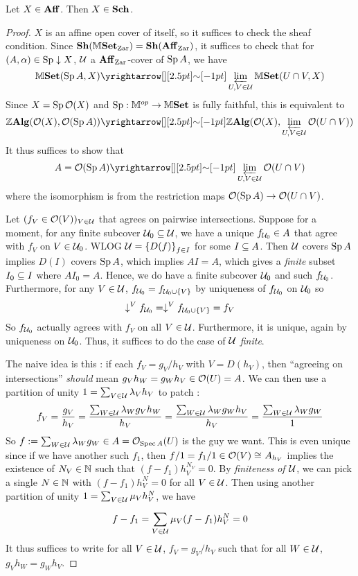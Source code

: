 \documentclass[../main.tex]{subfiles}
\begin{document}
\begin{prop}
  
  Let $X \in \mathbf{Aff}$.
  Then $X \in \mathbf{Sch}$.
\end{prop}
\begin{proof}
  $X$ is an affine open cover of itself, so it suffices to check 
  the sheaf condition. 
  Since $\mathbf{Sh}(\mathbb{M}\mathbf{Set}_{\mathrm{Zar}}) = \mathbf{Sh}(\mathbf{Aff}_{\mathrm{Zar}})$,
  it suffices to check that for 
  $(A,\alpha) \in \operatorname{Sp}\downarrow X$, $\mathcal{U}$ a $\mathbf{Aff}_{\mathrm{Zar}}$-cover of $\operatorname{Sp} A$, 
  we have \[
    \M\SET(\SP A,X) \map{\sim}{} \LIM_{U,V \in \UU} \M\SET(U\cap V,X)
  \]
  Since $X = \operatorname{Sp} \mathcal{O}(X)$ and $\operatorname{Sp} : \mathbb{M}^{op} \to \mathbb{M}\mathbf{Set}$ is fully faithful,
  this is equivalent to \[
    \Z\ALG(\OO(X),\OO(\SP A)) \map{\sim}{}
    \Z\ALG(\OO(X),\LIM_{U,V\in \UU} \OO(U\cap V))
  \]
  It thus suffices to show that \[
    A = \OO(\SP A) \map{\sim}{} \LIM_{U,V \in \UU} \OO(U \cap V)
  \]
  where the isomorphism is from the restriction maps 
  $\mathcal{O}(\operatorname{Sp} A) \to \mathcal{O}(U \cap V)$.

  Let $(f_V \in \mathcal{O}(V))_{V \in \mathcal{U}}$ that agrees on pairwise intersections.
  Suppose for a moment, 
  for any finite subcover $\mathcal{U}_0 \subseteq \mathcal{U}$,
  we have a unique $f_{\mathcal{U}_0} \in A$ that 
  agree with $f_V$ on $V \in \mathcal{U}_0$.
  WLOG $\mathcal{U} = \left\{D(f)\right\}_{f \in I}$ for some $I \subseteq A$.
  Then $\mathcal{U}$ covers $\operatorname{Sp} A$ implies 
  $D(I)$ covers $\operatorname{Sp} A$, which implies $AI = A$,
  which gives a \emph{finite} subset $I_0 \subseteq I$ where $AI_0 = A$.
  Hence, we do have a finite subcover $\mathcal{U}_0$ and such $f_{\mathcal{U}_0}$.
  Furthermore, 
  for any $V \in \mathcal{U}$, $f_{\mathcal{U}_0} = f_{\mathcal{U}_0 \cup \left\{V\right\}}$ by 
  uniqueness of $f_{\mathcal{U}_0}$ on $\mathcal{U}_0$ so
  \[
    \downarrow_{}^{V} f_{\mathcal{U}_0} = \downarrow_{}^{V} f_{\mathcal{U}_0 \cup \left\{V\right\}} = f_V
  \]
  So $f_{\mathcal{U}_0}$ actually agrees with $f_V$ on all $V \in \mathcal{U}$.
  Furthermore, it is unique, again by uniqueness on $\mathcal{U}_0$.
  Thus, it suffices to do the case of \emph{$\mathcal{U}$ finite}.

  The naive idea is this : 
  if each $f_V = g_V / h_V$ with $V = D(h_V)$,
  then ``agreeing on intersections'' \emph{should} mean 
  $g_V h_W = g_W h_V \in \mathcal{O}(U) = A$.
  We can then use a partition of unity $1 = \sum_{V \in \mathcal{U}}^{} \lambda_V h_V$
  to patch : \[
    f_V = \frac{g_V}{h_V}
    = \frac{\sum_{W \in \mathcal{U}}^{} \lambda_W g_V h_W}{h_V}
    = \frac{\sum_{W \in \mathcal{U} }^{} \lambda_W g_W h_V}{h_V}
    = \frac{\sum_{W \in \mathcal{U}}^{} \lambda_W g_W}{1}
  \]
  So $f := \sum_{W \in \mathcal{U}}^{} \lambda_W g_W \in A = \mathcal{O}_{\operatorname{Spec} A}(U)$ 
  is the guy we want. 
  This is even unique since if we have another such $f_1$,
  then $f/1 = f_1 / 1 \in \mathcal{O}(V) \cong_{} A_{h_V}$ implies
  the existence of $N_V \in \mathbb{N}$ such that $(f - f_1) h_V^{N_V} = 0$.
  By \emph{finiteness of $\mathcal{U}$},
  we can pick a single $N \in \mathbb{N}$ with 
  $(f - f_1) h_V^N = 0$ for all $V \in \mathcal{U}$.
  Then using another partition of unity $1 = \sum_{V \in \mathcal{U}}^{} \mu_V h_V^N$,
  we have \[
    f - f_1 = \sum_{V \in \mathcal{U}}^{} \mu_V (f - f_1) h_V^N = 0
  \]
  It thus suffices to write for all $V \in \mathcal{U}$,
  $f_V = g_V / h_V$ such that for all $W \in \mathcal{U}$, $g_V h_W = g_W h_V$.


\end{proof}
\end{document}
